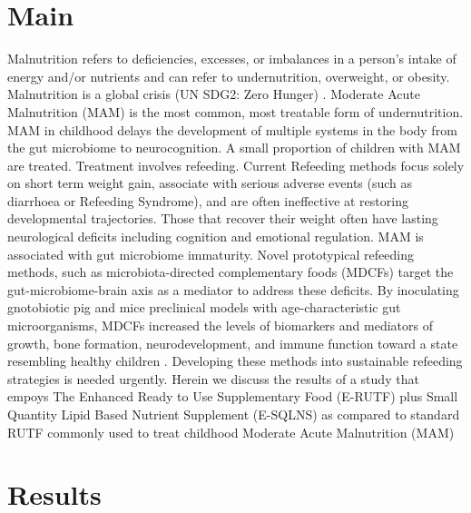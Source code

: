 \documentclass{article}
\begin{document}
\section*{Main}
Malnutrition refers to deficiencies, excesses, or imbalances in a person’s intake of energy and/or nutrients and can refer to undernutrition, overweight, or obesity.
Malnutrition is a global crisis (UN SDG2: Zero Hunger) \cite{UN_SDG2}.
Moderate Acute Malnutrition (MAM) is the most common, most treatable form of undernutrition.
MAM in childhood delays the development of multiple systems in the body from the gut microbiome to neurocognition.
A small proportion of children with MAM are treated.
Treatment involves refeeding.
Current Refeeding methods focus solely on short term weight gain, associate with serious adverse events (such as diarrhoea or Refeeding Syndrome), and are often ineffective at restoring developmental trajectories. Those that recover their weight often have lasting neurological deficits including cognition and emotional regulation.
MAM is associated with gut microbiome immaturity.
Novel prototypical refeeding methods, such as microbiota-directed complementary foods (MDCFs) target the gut-microbiome-brain axis as a mediator to address these deficits.
By inoculating gnotobiotic pig and mice preclinical models with age-characteristic gut microorganisms, MDCFs increased the levels of biomarkers and mediators of growth, bone formation, neurodevelopment, and immune function toward a state resembling healthy children \cite{gehrig2019effects}.
Developing these methods into sustainable refeeding strategies is needed urgently.
Herein we discuss the results of a study that empoys The Enhanced Ready to Use Supplementary Food (E-RUTF) plus Small Quantity Lipid Based Nutrient Supplement (E-SQLNS) as compared to standard RUTF commonly used to treat childhood Moderate Acute Malnutrition (MAM) 

\section*{Results}
\end{document}
